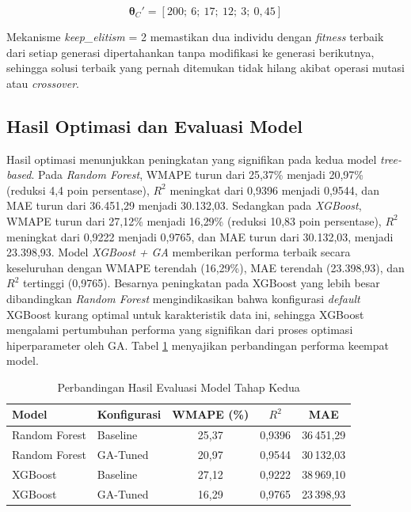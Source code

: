 \begin{equation}
\boldsymbol{\theta}_C' = [200;\ 6;\ 17;\ 12;\ 3;\ 0{,}45]
\end{equation}

Mekanisme \textit{keep\_elitism} = 2 memastikan dua individu dengan \textit{fitness} terbaik dari setiap generasi dipertahankan tanpa modifikasi ke generasi berikutnya, sehingga solusi terbaik yang pernah ditemukan tidak hilang akibat operasi mutasi atau \textit{crossover}.

\subsection{Hasil Optimasi dan Evaluasi Model}
\label{subsec:hasil_optimasi_ga}

Hasil optimasi menunjukkan peningkatan yang signifikan pada kedua model \textit{tree-based}. Pada \textit{Random Forest}, WMAPE turun dari 25,37\% menjadi 20,97\% (reduksi 4,4 poin persentase), $R^2$ meningkat dari 0,9396 menjadi 0,9544, dan MAE turun dari 36.451,29 menjadi 30.132,03. Sedangkan pada \textit{XGBoost}, WMAPE turun dari 27,12\% menjadi 16,29\% (reduksi 10,83 poin persentase), $R^2$ meningkat dari 0,9222 menjadi 0,9765, dan MAE turun dari 30.132,03, menjadi 23.398,93. Model \textit{XGBoost + GA} memberikan performa terbaik secara keseluruhan dengan WMAPE terendah (16,29\%), MAE terendah (23.398,93), dan $R^2$ tertinggi (0,9765). Besarnya peningkatan pada XGBoost yang lebih besar dibandingkan \textit{Random Forest} mengindikasikan bahwa konfigurasi \textit{default} XGBoost kurang optimal untuk karakteristik data ini, sehingga XGBoost mengalami pertumbuhan performa yang signifikan dari proses optimasi hiperparameter oleh GA. Tabel \ref{tab:perbandingan_model} menyajikan perbandingan performa keempat model.

\begin{table}[H]
\centering
\caption{Perbandingan Hasil Evaluasi Model Tahap Kedua}
\label{tab:perbandingan_model}
\begin{tabular}{llccc}
\toprule
\textbf{Model} & \textbf{Konfigurasi} & \textbf{WMAPE (\%)} & \textbf{$R^2$} & \textbf{MAE} \\
\midrule
Random Forest  & Baseline  & 25,37 & 0,9396 & 36\,451,29 \\
Random Forest  & GA-Tuned  & 20,97 & 0,9544 & 30\,132,03 \\
XGBoost        & Baseline  & 27,12 & 0,9222 & 38\,969,10 \\
XGBoost        & GA-Tuned  & 16,29 & 0,9765 & 23\,398,93 \\
\bottomrule
\end{tabular}
\end{table}

